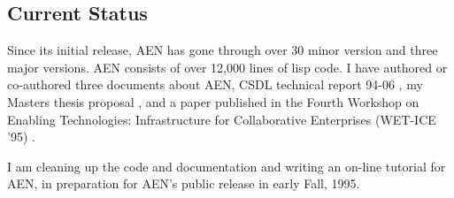 \subsection{Current Status}

Since its initial release, AEN has gone through over 30 minor version and
three major versions.  AEN consists of over 12,000 lines of lisp code. I
have authored or co-authored three documents about AEN, CSDL technical
report 94-06 \cite{csdl-94-06}, my Masters thesis proposal
\cite{csdl-94-16}, and a paper published in the Fourth
Workshop on Enabling Technologies: Infrastructure for Collaborative
Enterprises (WET-ICE '95) \cite{csdl-94-20}.

I am cleaning up the code and documentation and writing an on-line tutorial
for AEN, in preparation for AEN's public release in early Fall, 1995.



